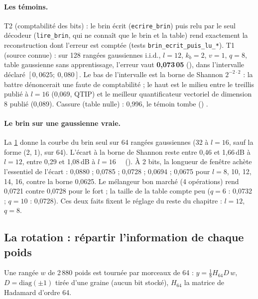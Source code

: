 \paragraph{Les témoins.} T2 (comptabilité des bits) : le brin écrit (\texttt{ecrire\_brin}) puis relu par le seul décodeur (\texttt{lire\_brin}, qui ne connaît que le brin et la table) rend exactement la reconstruction dont l'erreur est comptée (tests \texttt{brin\_ecrit\_puis\_lu\_*}). T1 (source connue) : sur 128 rangées gaussiennes i.i.d., $l = 12$, $k_b = 2$, $v = 1$, $q = 8$, table gaussienne sans apprentissage, l'erreur vaut \textbf{0,073\,05} (), dans l'intervalle déclaré $[0{,}0625 ;\ 0{,}080]$. Le bas de l'intervalle est la borne de Shannon $2^{-2\cdot 2}$ : la battre dénoncerait une faute de comptabilité ; le haut est le milieu entre le treillis publié à $l = 16$ (0,069, QTIP) et le meilleur quantificateur vectoriel de dimension 8 publié (0,089). Cassure (table nulle) : 0,996, le témoin tombe () \mes.

\begin{figure}[tbp]
\centering
\GrapheGenGauss
{}
\label{fig:t3-gen-gauss}
\end{figure}

\paragraph{Le brin sur une gaussienne vraie.} La \cref{fig:t3-gen-gauss} donne la courbe du brin seul sur 64 rangées gaussiennes (32 à $l = 16$, sauf la forme (2, 1), sur 64). L'écart à la borne de Shannon reste entre 0,46 et 1,66\,dB à $l = 12$, entre 0,29 et 1,08\,dB à $l = 16$ \mes~\calc~(). À 2 bits, la longueur de fenêtre achète l'essentiel de l'écart : 0,0880 ; 0,0785 ; 0,0728 ; 0,0694 ; 0,0675 pour $l = 8$, 10, 12, 14, 16, contre la borne 0,0625. Le mélangeur bon marché (4 opérations) rend 0,0721 contre 0,0728 pour le fort ; la taille de la table compte peu ($q = 6$ : 0,0732 ; $q = 10$ : 0,0728). Ces deux faits fixent le réglage du reste du chapitre : $l = 12$, $q = 8$.

\subsection{La rotation : répartir l'information de chaque poids}

Une rangée $w$ de 2\,880 poids est tournée par morceaux de 64 : $y = \frac18 H_{64} D\, w$, $D = \mathrm{diag}(\pm1)$ tirée d'une graine (aucun bit stocké), $H_{64}$ la matrice de Hadamard d'ordre 64.

